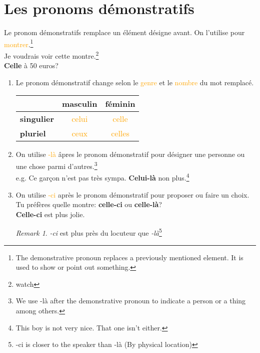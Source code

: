 \documentclass[math,code]{amznotes}
\theoremstyle{remark}
\newtheorem*{remark}{Remark}
\begin{document}
\section{Les pronoms démonstratifs}
Le pronom démonstratifs remplace un élément désigne avant. On l'utilise pour \textcolor{orange}{montrer}.\footnote{The demonstrative pronoun replaces a previously mentioned element. It is used to show or point out something.} \\
Je voudrais voir cette montre.\footnote{watch} \\
\textbf{Celle} à 50 euros?
\begin{enumerate}
    \item Le pronom démonstratif change selon le \textcolor{orange}{genre} et le \textcolor{orange}{nombre} du mot remplacé.
    \begin{table}[H]
        \centering
        \renewcommand{\arraystretch}{1.5}
        \begin{tabular}{|l|c|c|}
            \hline
             & \textbf{masculin} & \textbf{féminin} \\
            \hline
            \textbf{singulier} & \textcolor{orange}{celui} & \textcolor{orange}{celle} \\ 
            \hline
            \textbf{pluriel} & \textcolor{orange}{ceux} & \textcolor{orange}{celles} \\ 
            \hline
        \end{tabular}
    \end{table}
    \item On utilise \textcolor{orange}{-là} âpres le pronom démonstratif pour désigner une personne ou une chose parmi d'autres.\footnote{We use -là after the demonstrative pronoun to indicate a person or a thing among others.} \\
    e.g. Ce garçon n'est pas très sympa. \textbf{Celui-là} non plus.\footnote{This boy is not very nice. That one isn't either.}
    \item On utilise \textcolor{orange}{-ci} après le pronom démonstratif pour proposer ou faire un choix. \\
    Tu préfères quelle montre: \textbf{celle-ci} ou \textbf{celle-là}? \\
    \textbf{Celle-ci} est plus jolie.
    \begin{notebox}
        \begin{remark}
            \textit{-ci} est plus près du locuteur que \textit{-là}\footnote{-ci is closer to the speaker than -là (By physical location)}
        \end{remark}
    \end{notebox}
\end{enumerate}
\end{document}
